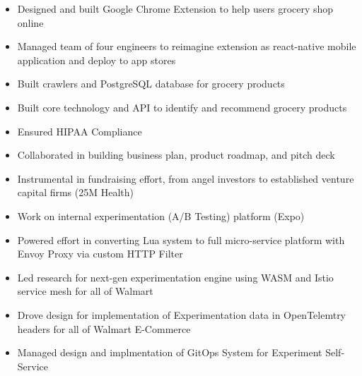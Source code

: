 \documentclass[10pt,a4paper,ragged2e,withhyper]{altacv}
\begin{document}
\begin{paracol}{2}
  
  \begin{itemize}
    \item Designed and built Google Chrome Extension to help users grocery shop online
    \item Managed team of four engineers to reimagine extension as react-native mobile application and deploy to app stores
    \item Built crawlers and PostgreSQL database for grocery products
    \item Built core technology and API to identify and recommend grocery products
    \item Ensured HIPAA Compliance
    \item Collaborated in building business plan, product roadmap, and pitch deck
    \item Instrumental in fundraising effort, from angel investors to established venture capital firms (25M Health)
  \end{itemize}
  
  \divider
  
  \begin{itemize}
    \item Work on internal experimentation (A/B Testing) platform (Expo)
    \item Powered effort in converting Lua system to full micro-service platform with Envoy Proxy via custom HTTP Filter
    \item Led research for next-gen experimentation engine using WASM and Istio service mesh for all of Walmart %
    \item Drove design for implementation of Experimentation data in OpenTelemtry headers for all of Walmart E-Commerce
    \item Managed design and implmentation of GitOps System for Experiment Self-Service
  \end{itemize}
  

\end{paracol}
\end{document}

